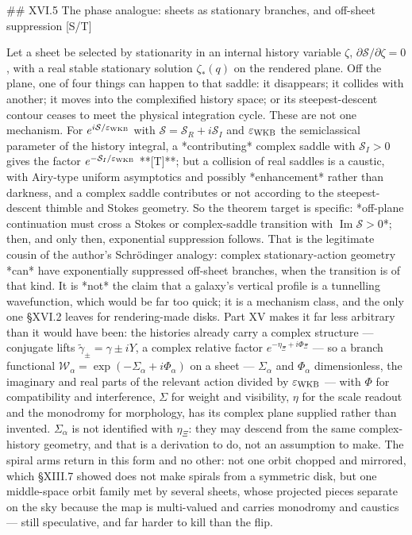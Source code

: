 ## XVI.5 The phase analogue: sheets as stationary branches, and off-sheet suppression [S/T]

Let a sheet be selected by stationarity in an internal history variable $\zeta$, $\partial\mathcal S/\partial\zeta = 0$, with a real stable stationary solution $\zeta_*(q)$ on the rendered plane. Off the plane, one of four things can happen to that saddle: it disappears; it collides with another; it moves into the complexified history space; or its steepest-descent contour ceases to meet the physical integration cycle. These are not one mechanism. For $e^{i\mathcal S/\varepsilon_{\rm WKB} }$ with $\mathcal S = \mathcal S_R+i\mathcal S_I$ and $\varepsilon_{\rm WKB}$ the semiclassical parameter of the history integral, a *contributing* complex saddle with $\mathcal S_I>0$ gives the factor $e^{-\mathcal S_I/\varepsilon_{\rm WKB} }$ **[T]**; but a collision of real saddles is a caustic, with Airy-type uniform asymptotics and possibly *enhancement* rather than darkness, and a complex saddle contributes or not according to the steepest-descent thimble and Stokes geometry. So the theorem target is specific: *off-plane continuation must cross a Stokes or complex-saddle transition with $\operatorname{Im}\mathcal S>0$*; then, and only then, exponential suppression follows. That is the legitimate cousin of the author's Schrödinger analogy: complex stationary-action geometry *can* have exponentially suppressed off-sheet branches, when the transition is of that kind. It is *not* the claim that a galaxy's vertical profile is a tunnelling wavefunction, which would be far too quick; it is a mechanism class, and the only one §XVI.2 leaves for rendering-made disks. Part XV makes it far less arbitrary than it would have been: the histories already carry a complex structure — conjugate lifts $\widetilde\gamma_\pm = \gamma\pm iY$, a complex relative factor $e^{-\eta_\Xi+i\Phi_\Xi}$ — so a branch functional $\mathscr W_\alpha = \exp(-\Sigma_\alpha+i\Phi_\alpha)$ on a sheet — $\Sigma_\alpha$ and $\Phi_\alpha$ dimensionless, the imaginary and real parts of the relevant action divided by $\varepsilon_{\rm WKB}$ — with $\Phi$ for compatibility and interference, $\Sigma$ for weight and visibility, $\eta$ for the scale readout and the monodromy for morphology, has its complex plane supplied rather than invented. $\Sigma_\alpha$ is not identified with $\eta_\Xi$: they may descend from the same complex-history geometry, and that is a derivation to do, not an assumption to make. The spiral arms return in this form and no other: not one orbit chopped and mirrored, which §XIII.7 showed does not make spirals from a symmetric disk, but one middle-space orbit family met by several sheets, whose projected pieces separate on the sky because the map is multi-valued and carries monodromy and caustics — still speculative, and far harder to kill than the flip.

